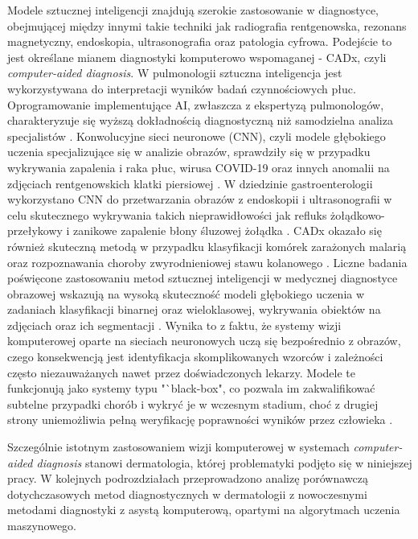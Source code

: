 Modele sztucznej inteligencji znajdują szerokie zastosowanie w diagnostyce, obejmującej między innymi takie techniki jak radiografia rentgenowska, rezonans magnetyczny, endoskopia, ultrasonografia oraz patologia cyfrowa.
Podejście to jest określane mianem diagnostyki komputerowo wspomaganej - CADx, czyli \textit{computer-aided diagnosis}.
W pulmonologii sztuczna inteligencja jest wykorzystywana do interpretacji wyników badań czynnościowych płuc.
Oprogramowanie implementujące AI, zwłaszcza z ekspertyzą pulmonologów, charakteryzuje się wyższą dokładnością diagnostyczną niż samodzielna analiza specjalistów \cite{das_collaboration_2023, topalovic_artificial_2019}.
Konwolucyjne sieci neuronowe (CNN), czyli modele głębokiego uczenia specjalizujące się w analizie obrazów, sprawdziły się w przypadku wykrywania zapalenia i raka płuc, wirusa COVID-19 oraz innych anomalii na zdjęciach rentgenowskich klatki piersiowej \cite{rajaraman_visualization_2018, ismael_deep_2021, hussain_corodet_2021, lee_validation_2023}.
W dziedzinie gastroenterologii wykorzystano CNN do przetwarzania obrazów z endoskopii i ultrasonografii w celu skutecznego wykrywania takich nieprawidłowości jak refluks żołądkowo-przełykowy i zanikowe zapalenie błony śluzowej żołądka \cite{briganti_artificial_2020, yang_application_2019}.
CADx okazało się również skuteczną metodą w przypadku klasyfikacji komórek zarażonych malarią oraz rozpoznawania choroby zwyrodnieniowej stawu kolanowego \cite{rajaraman_pre-trained_2018, adaptive_2023}. 
Liczne badania poświęcone zastosowaniu metod sztucznej inteligencji w medycznej diagnostyce obrazowej wskazują na wysoką skuteczność modeli głębokiego uczenia w zadaniach klasyfikacji binarnej oraz wieloklasowej, wykrywania obiektów na zdjęciach oraz ich segmentacji \cite{ais.2021.15}.
Wynika to z faktu, że systemy wizji komputerowej oparte na sieciach neuronowych uczą się bezpośrednio z obrazów, czego konsekwencją jest identyfikacja skomplikowanych wzorców i zależności często niezauważanych nawet przez doświadczonych lekarzy.
Modele te funkcjonują jako systemy typu "`black-box", co pozwala im zakwalifikować subtelne przypadki chorób i wykryć je w wczesnym stadium, choć z drugiej strony uniemożliwia pełną weryfikację poprawności wyników przez człowieka \cite{lidstromer_artificial_2021}. 

Szczególnie istotnym zastosowaniem wizji komputerowej w systemach \textit{computer-aided diagnosis} stanowi dermatologia, której problematyki podjęto się w niniejszej pracy.
W kolejnych podrozdziałach przeprowadzono analizę porównawczą dotychczasowych metod diagnostycznych w dermatologii z nowoczesnymi metodami diagnostyki z asystą komputerową, opartymi na algorytmach uczenia maszynowego.

